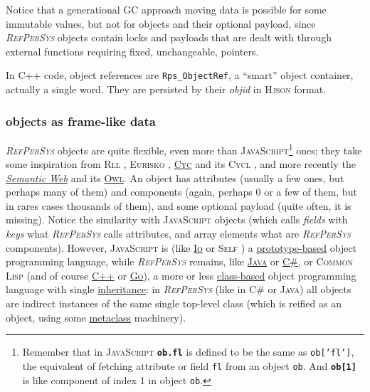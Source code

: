 \documentclass[11pt,a4paper,svgnames]{article}
\newcommand{\RefPerSys}{{\textit{\textsc{RefPerSys}}}}
\begin{document}
Notice that a generational GC approach moving data is possible for
some immutable values, but not for objects and their optional payload,
since {\RefPerSys} objects contain locks and payloads that are dealt
with through external functions requiring fixed, unchangeable, pointers.

In C++ code, object references are \texttt{Rps\_ObjectRef}, a
``smart'' object container, actually a single word. They are persisted
by their \textit{objid} in \textsc{Hjson} format.

\subsubsection{objects as frame-like data}
\label{subsubsec:obj-frame}

{\RefPerSys} objects are quite flexible, even more than
\textsc{JavaScript}\footnote{Remember that in \textsc{JavaScript}
\textbf{\texttt{ob.fl}} is defined to be the same as
\texttt{ob['fl']}, the equivalent of fetching attribute or field
\texttt{fl} from an object \texttt{ob}. And \textbf{\texttt{ob[1]}} is
like component of index 1 in object \texttt{ob}.} ones; they take some
inspiration from \textsc{Rll} \cite{greiner:1980:representation},
\textsc{Eurisko} \cite{Lenat:1983:Eurisko, Lenat:1983:theory},
\href{https://en.wikipedia.org/wiki/Cyc}{\textsc{Cyc}} and its
\textsc{Cycl} \cite{Lenat:1991:ev-cycl}, and more recently the
\href{https://en.wikipedia.org/wiki/Semantic_Web}{\textit{Semantic
    Web}} and its
\href{https://www.w3.org/TR/owl-ref/}{\textsc{Owl}}. An object has
attributes (usually a few ones, but perhaps many of them) and
components (again, perhaps 0 or a few of them, but in rares cases
thousands of them), and some optional payload (quite often, it is
missing). Notice the similarity with \textsc{JavaScript} objects
(which calls \emph{fields} with \emph{keys} what {\RefPerSys} calls
attributes, and array elements what are {\RefPerSys}
components). However, \textsc{JavaScript} is (like
\href{http://iolanguage.com/}{\textsc{Io}} or \textsc{Self}
\cite{chambers:1991:efficient}) a
\href{https://en.wikipedia.org/wiki/Prototype-based_programming}{prototype-based}
object programming language, while {\RefPerSys} remains, like
\href{https://en.wikipedia.org/wiki/Java_(programming_language)}{\textsc{Java}}
or
\href{https://en.wikipedia.org/wiki/C_Sharp_(programming_language)}{\textsc{C\#}},
or \textsc{Common Lisp} (and of course
\href{https://en.cppreference.com/w/cpp}{\textsc{C++}} or
\href{https://golang.org/}{\textsc{Go}}), a more or less
\href{https://en.wikipedia.org/wiki/Class_(computer_programming)}{class-based}
object programming language with single
\href{https://en.wikipedia.org/wiki/Inheritance_(object-oriented_programming)}{inheritance}:
in {\RefPerSys} (like in \textsc{C\#} or \textsc{Java}) all objects
are indirect instances of the same single top-level class (which is
reified as an object, using some
\href{https://en.wikipedia.org/wiki/Metaclass}{metaclass} machinery).
\end{document}
